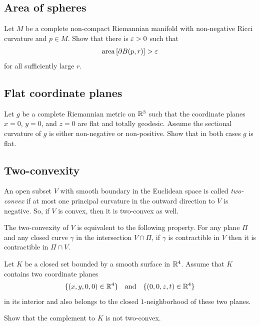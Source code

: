 \subsection*{Area of spheres}
\label{Area of spheres}

\begin{pr}
Let $M$ be a complete non-compact Riemannian manifold 
with non-negative Ricci curvature and $p\in M$.
Show that there is $\varepsilon>0$ such that 
$$\operatorname{\rm area}\nolimits\left[\partial B(p,r)\right]>\varepsilon$$
for all sufficiently large $r$.
\end{pr}

\subsection*{Flat coordinate planes}
\label{Flat coordinate planes}

\begin{pr}
Let $g$ be a complete Riemannian metric on $\mathbb{R}^3$ such that the coordinate planes $x=0$, $y=0$, and $z=0$ are flat and totally geodesic.
Assume the sectional curvature of $g$ is either non-negative or non-positive.
Show that in both cases $g$ is flat. 
\end{pr}

\subsection*{Two-convexity\many}
\label{Two-convexity}

An open subset $V$ with smooth boundary in the Euclidean space  
is called \emph{two-convex} if at most one principal curvature in the outward direction to $V$ is negative.
So, if $V$ is convex, then it is two-convex as well.

The two-convexity of $V$ is equivalent to the following property.
For any plane $\Pi$ and any closed curve $\gamma$ in the intersection  $V\cap \Pi$,
if $\gamma$ is contractible in $V$ then it is contractible in $\Pi\cap V$.

\begin{pr}
Let $K$ be a closed set bounded by a smooth surface
in $\mathbb{R}^4$.
Assume that $K$ contains two coordinate planes 
$$\{(x,y,0,0)\in\mathbb{R}^4\}
\quad
\text{and}
\quad
\{(0,0,z,t)\in\mathbb{R}^4\}$$
in its interior 
and also belongs to the closed $1$-neighborhood of these two planes.

Show that the complement to $K$ is not two-convex.
\end{pr}


